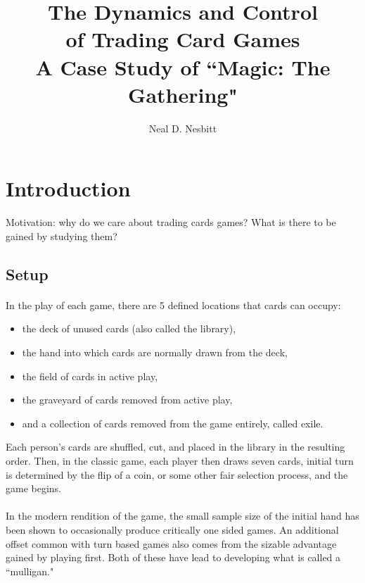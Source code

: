 \documentclass{article}
\title{The Dynamics and Control\\
 of Trading Card Games\\
A Case Study of ``Magic: The Gathering"}
\author{Neal D. Nesbitt}
\begin{document}
\maketitle

\theoremstyle{definition}
\newtheorem{definition}{Definition}[section]
\newtheorem{lemma}{Lemma}[section]

		
\section{Introduction}

Motivation: why do we care about trading cards games? What is there to be gained by studying them?

\subsection{Setup}

\paragraph{}
In the play of each game, there are 5 defined locations that cards can occupy:
\begin{itemize}
\item the deck of unused cards (also called the library),
\item the hand into which cards are normally drawn from the deck,
\item the field of cards in active play,
\item the graveyard of cards removed from active play,
\item and a collection of cards removed from the game entirely, called exile.
\end{itemize}

Each person's cards are shuffled, cut, and placed in the library in the resulting order. Then, in the classic game, each player then draws seven cards, initial turn is determined by the flip of a coin, or some other fair selection process, and the game begins.

\paragraph{}
In the modern rendition of the game, the small sample size of the initial hand has been shown to occasionally produce critically one sided games. An additional offset common with turn based games also comes from the sizable advantage gained by playing first. Both of these have lead to developing what is called a ``mulligan." 
\end{document}
